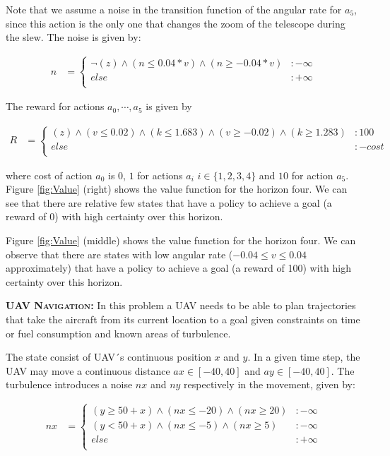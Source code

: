 Note that we assume a noise in the transition function of the angular rate for $a_5$, since this action is the only one that changes the zoom of the telescope during the slew. The noise is given by:

{\footnotesize
\begin{align*}
n & = \begin{cases}
\neg (z) \wedge (n \leq 0.04*v) \wedge (n \geq -0.04*v) &:-\infty\\
else &: +\infty\\
\end{cases}
\end{align*}}

The reward for actions $a_0, \cdots ,a_5$ is given by

{\tiny
\begin{align*}
R & = \begin{cases}
(z) \wedge (v \leq 0.02) \wedge (k \leq 1.683) \wedge (v \geq -0.02) \wedge (k \geq 1.283) &:100\\
else &: -cost\\
\end{cases}
\end{align*}}

where cost of action $a_0$  is 0, $1$ for actions $a_i$ $i \in \{1,2,3,4\}$ and $10$ for action $a_5$.
Figure \ref{fig:Value} (right) shows the value function for the horizon four. We can see that there are relative few states that have a policy to achieve a goal (a reward of 0) with high certainty over this horizon.


Figure \ref{fig:Value} (middle) shows the value function for the horizon four. We can observe  that there are states with low angular rate ($-0.04\leq v \leq 0.04$ approximately) that have a policy to achieve a goal (a reward of 100) with high certainty over this horizon.


{\bf \textsc{UAV Navigation}:}
In this problem a UAV needs to be able to plan
trajectories that take the aircraft from its current location to
a goal given constraints on time or fuel
consumption and known areas of turbulence.

The state consist of UAV´s continuous position $x$ and $y$.
In a given time step, the UAV may move a continuous distance $ax \in [-40,40]$ and $ay \in [-40,40]$. The turbulence introduces a noise $nx$ and $ny$ respectively in the movement, given by:

{\footnotesize
\begin{align*}
nx & = \begin{cases}
(y \geq 50 + x) \wedge (nx \leq -20) \wedge (nx \geq 20) &:-\infty\\
(y < 50 + x) \wedge (nx \leq -5) \wedge (nx \geq 5) &:-\infty\\
else &: +\infty\\
\end{cases}
\end{align*}}

